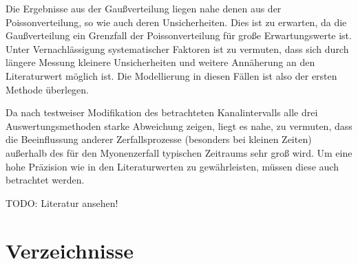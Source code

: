 \documentclass[slug=LM, room=Andreas-Schubert-Bau\,\ K\ 1A, supervisor=Anne-Sophie\ Berthold, coursedate=13.\ 12.\ 2019]{../../Lab_Report_LaTeX/lab_report}
\begin{document}
Die Ergebnisse aus der Gaußverteilung liegen nahe denen aus der
Poissonverteilung, so wie auch deren Unsicherheiten. Dies ist zu
erwarten, da die Gaußverteilung ein Grenzfall der Poissonverteilung
f\"ur gro\ss{}e Erwartungswerte ist. Unter Vernachl\"assigung
systematischer Faktoren ist zu vermuten, dass sich durch l\"angere
Messung kleinere Unsicherheiten und weitere Ann\"aherung an den
Literaturwert m\"oglich ist. Die Modellierung in diesen F\"allen ist
also der ersten Methode \"uberlegen.

Da nach testweiser Modifikation des betrachteten Kanalintervalls alle
drei Auswertungsmethoden starke Abweichung zeigen, liegt es nahe, zu
vermuten, dass die Beeinflussung anderer Zerfallsprozesse (besonders
bei kleinen Zeiten) außerhalb des f\"ur den Myonenzerfall typischen
Zeitraums sehr gro\ss{} wird. Um eine hohe Pr\"azision wie in den
Literaturwerten zu gew\"ahrleisten, m\"ussen diese auch betrachtet
werden.

TODO: Literatur ansehen!
\newpage
\section{Verzeichnisse}
\label{sec:literatur}

\listoffigures

\listoftables

\printbibliography
\end{document}

